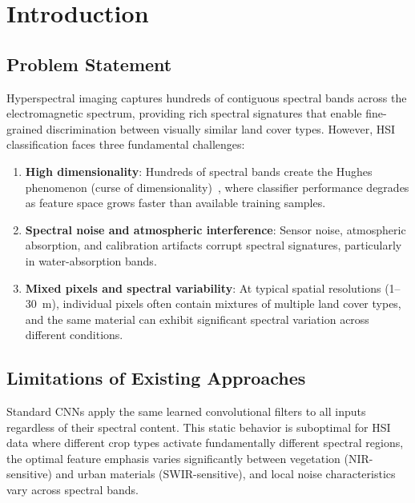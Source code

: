 \documentclass[conference]{IEEEtran}
\begin{document}
\section{Introduction}

\subsection{Problem Statement}

Hyperspectral imaging captures hundreds of contiguous spectral bands across the electromagnetic spectrum, providing rich spectral signatures that enable fine-grained discrimination between visually similar land cover types. However, HSI classification faces three fundamental challenges:

\begin{enumerate}
\item \textbf{High dimensionality}: Hundreds of spectral bands create the Hughes phenomenon (curse of dimensionality)~\cite{hughes1968mean}, where classifier performance degrades as feature space grows faster than available training samples.
\item \textbf{Spectral noise and atmospheric interference}: Sensor noise, atmospheric absorption, and calibration artifacts corrupt spectral signatures, particularly in water-absorption bands.
\item \textbf{Mixed pixels and spectral variability}: At typical spatial resolutions (1--30~m), individual pixels often contain mixtures of multiple land cover types, and the same material can exhibit significant spectral variation across different conditions.
\end{enumerate}

\subsection{Limitations of Existing Approaches}

Standard CNNs apply the same learned convolutional filters to all inputs regardless of their spectral content. This static behavior is suboptimal for HSI data where different crop types activate fundamentally different spectral regions, the optimal feature emphasis varies significantly between vegetation (NIR-sensitive) and urban materials (SWIR-sensitive), and local noise characteristics vary across spectral bands.
\end{document}
